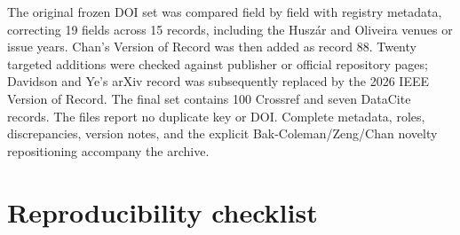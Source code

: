 \documentclass[pdflatex,sn-mathphys-num]{sn-jnl}
\begin{document}
\begin{appendices}
The original frozen DOI set was compared field by field with registry metadata, correcting 19 fields across 15 records, including the Husz\'ar and Oliveira venues or issue years. Chan's Version of Record was then added as record 88. Twenty targeted additions were checked against publisher or official repository pages; Davidson and Ye's arXiv record was subsequently replaced by the 2026 IEEE Version of Record. The final set contains 100 Crossref and seven DataCite records. The files report no duplicate key or DOI. Complete metadata, roles, discrepancies, version notes, and the explicit Bak-Coleman/Zeng/Chan novelty repositioning accompany the archive.

\section{Reproducibility checklist}


\end{appendices}
\end{document}
